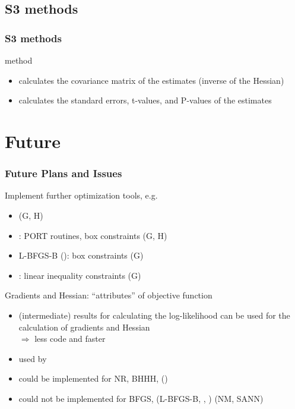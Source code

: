 \documentclass{beamer}
\begin{document}
\subsection{S3 methods}
\begin{frame}
\frametitle{S3 methods}
 method
\begin{itemize}
\item calculates the covariance matrix of the estimates (inverse of the Hessian)
\item calculates the standard errors, t-values, and P-values of the estimates
\end{itemize}

\end{frame}


\section{Future}
\begin{frame}
\frametitle{Future Plans and Issues}
Implement further optimization tools, e.g.
\begin{itemize}
\item {} (G, H)
\item {}: PORT routines, box constraints (G, H)
\item L-BFGS-B (): box constraints (G)
\item {}: linear inequality constraints (G)
\end{itemize}
\vspace*{1ex}
Gradients and Hessian: ``attributes'' of objective function
\begin{itemize}
\item (intermediate) results for calculating the log-likelihood
   can be used for the calculation of gradients and Hessian\\
   $\Rightarrow$ less code and faster
\item used by 
\item could be implemented for NR, BHHH, ()
\item could not be implemented for BFGS, (L-BFGS-B,
   , )
   (NM, SANN)
\end{itemize}
\end{frame}
\end{document}
